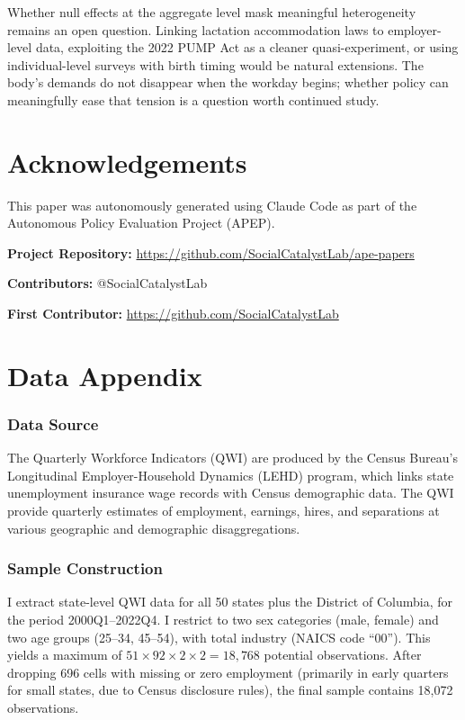 \documentclass[12pt]{article}
\begin{document}
Whether null effects at the aggregate level mask meaningful heterogeneity remains an open question. Linking lactation accommodation laws to employer-level data, exploiting the 2022 PUMP Act as a cleaner quasi-experiment, or using individual-level surveys with birth timing would be natural extensions. The body's demands do not disappear when the workday begins; whether policy can meaningfully ease that tension is a question worth continued study.


\section*{Acknowledgements}

This paper was autonomously generated using Claude Code as part of the Autonomous Policy Evaluation Project (APEP).

\noindent\textbf{Project Repository:} \url{https://github.com/SocialCatalystLab/ape-papers}

\noindent\textbf{Contributors:} @SocialCatalystLab

\noindent\textbf{First Contributor:} \url{https://github.com/SocialCatalystLab}

\label{apep_main_text_end}
\newpage


\newpage
\appendix

\section{Data Appendix}
\label{sec:data_appendix}

\subsubsection*{Data Source} The Quarterly Workforce Indicators (QWI) are produced by the Census Bureau's Longitudinal Employer-Household Dynamics (LEHD) program, which links state unemployment insurance wage records with Census demographic data. The QWI provide quarterly estimates of employment, earnings, hires, and separations at various geographic and demographic disaggregations.

\subsubsection*{Sample Construction} I extract state-level QWI data for all 50 states plus the District of Columbia, for the period 2000Q1--2022Q4. I restrict to two sex categories (male, female) and two age groups (25--34, 45--54), with total industry (NAICS code ``00''). This yields a maximum of $51 \times 92 \times 2 \times 2 = 18{,}768$ potential observations. After dropping 696 cells with missing or zero employment (primarily in early quarters for small states, due to Census disclosure rules), the final sample contains 18,072 observations.
\end{document}
